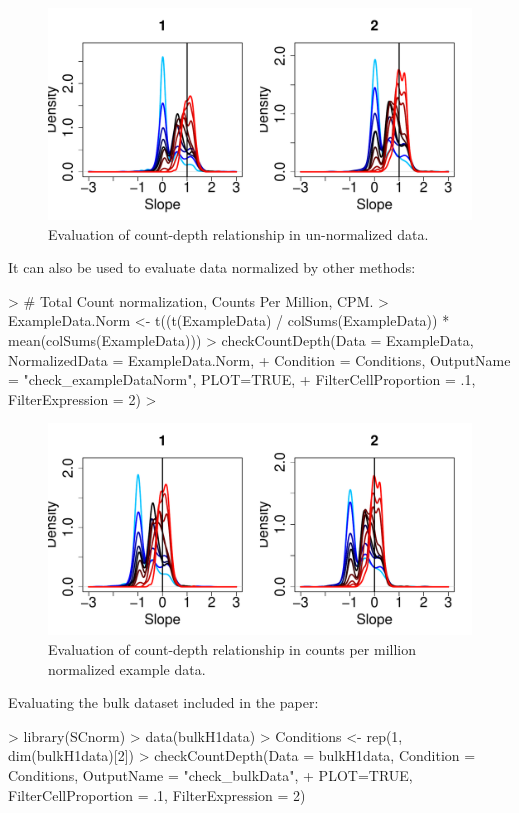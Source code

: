 \documentclass{article}
\begin{document}
\begin{figure}[h!]
\centering
\includegraphics[width=.7\textwidth]{check_exampleData_initial_evaluation.pdf}
\caption{Evaluation of count-depth relationship in un-normalized data.}
\end{figure}

\newpage
It can also be used to evaluate data normalized by other methods:
\begin{Schunk}
\begin{Sinput}
> # Total Count normalization, Counts Per Million, CPM. 
> ExampleData.Norm <- t((t(ExampleData) / colSums(ExampleData)) * mean(colSums(ExampleData))) 
> checkCountDepth(Data = ExampleData, NormalizedData = ExampleData.Norm, 
+                 Condition = Conditions, OutputName = "check_exampleDataNorm", PLOT=TRUE, 
+                 FilterCellProportion = .1, FilterExpression = 2)
> 
\end{Sinput}
\end{Schunk}

\begin{figure}[h!]
\centering
\includegraphics[width=.7\textwidth]{check_exampleDataNorm_count-depth_evaluation}
\caption{Evaluation of count-depth relationship in counts per million normalized example data.}
\end{figure}

Evaluating the bulk dataset included in the paper:
\begin{Schunk}
\begin{Sinput}
> library(SCnorm)
> data(bulkH1data)
> Conditions <- rep(1, dim(bulkH1data)[2])
> checkCountDepth(Data = bulkH1data, Condition = Conditions, OutputName = "check_bulkData", 
+                 PLOT=TRUE, FilterCellProportion = .1, FilterExpression = 2)
\end{Sinput}
\end{Schunk}
\end{document}
